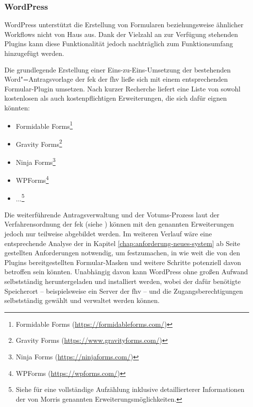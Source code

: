 \documentclass[a4paper,12pt,twoside]{scrreprt}
\begin{document}
\subsubsection*{WordPress}
\label{sub-sub-sec:wordpress}

WordPress unterstützt die Erstellung von Formularen beziehungsweise ähnlicher Workflows nicht von Haus aus. Dank der Vielzahl an zur Verfügung stehenden Plugins kann diese Funktionalität jedoch nachträglich zum Funktionsumfang hinzugefügt werden.

Die grundlegende Erstellung einer Eins-zu-Eins-Umsetzung der bestehenden Word"=Antragsvorlage der \ac{fek} der \ac{fhv} ließe sich mit einem entsprechenden Formular-Plugin umsetzen. Nach kurzer Recherche liefert \cite{morris_8_2023} eine Liste von sowohl kostenlosen als auch kostenpflichtigen Erweiterungen, die sich dafür eignen könnten:
\begin{itemize}
    \item Formidable Forms\footnote{Formidable Forms (\url{https://formidableforms.com/})}
    \item Gravity Forms\footnote{Gravity Forms (\url{https://www.gravityforms.com/})}
    \item Ninja Forms\footnote{Ninja Forms (\url{https://ninjaforms.com/})}
    \item WPForms\footnote{WPForms (\url{https://wpforms.com/})}
    \item ...\footnote{Siehe \cite{morris_8_2023} für eine vollständige Aufzählung inklusive detaillierterer Informationen der von Morris genannten Erweiterungsmöglichkeiten.}
\end{itemize}

Die weiterführende Antragsverwaltung und der Votums-Prozess laut der Verfahrensordnung der \ac{fek} (siehe \cite{forschungsethik-kommission_der_fachhochschule_vorarlberg_verfahrensordnung_2020}) können mit den genannten Erweiterungen jedoch nur teilweise abgebildet werden. Im weiteren Verlauf wäre eine entsprechende Analyse der in Kapitel \ref{chap:anforderung-neues-system} ab Seite \pageref{chap:anforderung-neues-system} gestellten Anforderungen notwendig, um festzumachen, in wie weit die von den Plugins bereitgestellten Formular-Masken und weitere Schritte potenziell davon betroffen sein könnten. Unabhängig davon kann WordPress ohne großen Aufwand selbstständig heruntergeladen und installiert werden, wobei der dafür benötigte Speicherort -- beispielsweise ein Server der \acl{fhv} -- und die Zugangsberechtigungen selbstständig gewählt und verwaltet werden können.
\end{document}
